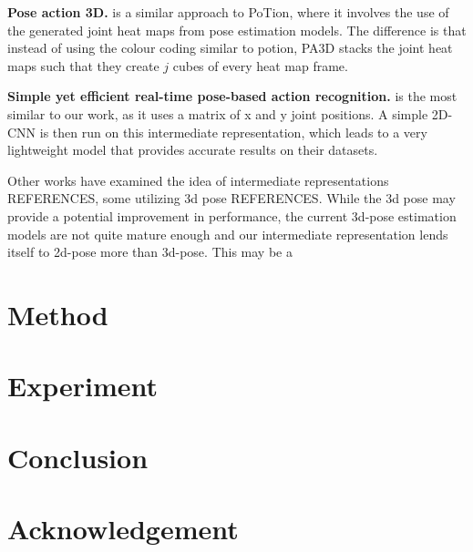 \documentclass[10pt,twocolumn,letterpaper]{article}
\begin{document}
\textbf{Pose action 3D.} \cite{PA3D} is a similar approach to PoTion, where it involves the use of the generated joint heat maps from pose estimation models. The difference is that instead of using the colour coding similar to potion, PA3D stacks the joint heat maps such that they create $j$ cubes of every heat map frame.

\textbf{Simple yet efficient real-time pose-based action recognition.} \cite{simple_yet_efficient} is the most similar to our work, as it uses a matrix of x and y joint positions. A simple 2D-CNN is then run on this intermediate representation, which leads to a very lightweight model that provides accurate results on their datasets.

Other works have examined the idea of intermediate representations REFERENCES, some utilizing 3d pose REFERENCES. While the 3d pose may provide a potential improvement in performance, the current 3d-pose estimation models are not quite mature enough and our intermediate representation lends itself to 2d-pose more than 3d-pose. This may be a 

\section{Method}
\label{sec:method}

\section{Experiment}
\label{sec:experiment}

\section{Conclusion}
\label{sec:conclusion}

\section{Acknowledgement}
\label{sec:acknowledgement}

{\small


}
\end{document}
